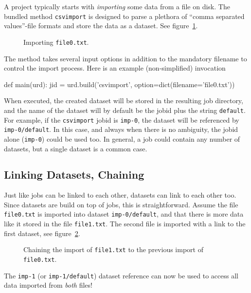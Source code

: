 A project typically starts with \textsl{importing} some data from a
file on disk.  The bundled method \texttt{csvimport} is designed to
parse a plethora of ``comma separated values''-file formats and store
the data as a dataset.  See figure~\ref{fig:dataset_csvimport}.
\begin{figure}[h!]
  \begin{center}
    
    \caption{Importing \texttt{file0.txt}.}
    \label{fig:dataset_csvimport}
  \end{center}
\end{figure}
The method takes several input options in addition to the mandatory
filename to control the import process.  Here is an example
(non-simplified) invocation
\begin{python}
def main(urd):
    jid = urd.build('csvimport', option=dict(filename='file0.txt'))  
\end{python}
When executed, the created dataset will be stored in the resulting job
directory, and the name of the dataset will by default be the jobid
plus the string \texttt{default}.  For example, if the
\texttt{csvimport} jobid is \texttt{imp-0}, the dataset will be
referenced by \texttt{imp-0/default}.  In this case, and always when
there is no ambiguity, the jobid alone (\texttt{imp-0}) could be used
too.  In general, a job could contain any number of datasets, but a
single dataset is a common case.




\subsection{Linking Datasets, Chaining}

Just like jobs can be linked to each other, datasets can link to each
other too.  Since datasets are build on top of jobs, this is
straightforward.  Assume the file \texttt{file0.txt} is imported into
dataset \texttt{imp-0/default}, and that there is more data like it
stored in the file \texttt{file1.txt}.  The second file is imported
with a link to the first dataset, see
figure~\ref{fig:dataset_csvimport_chain}.
\begin{figure}[h!]
  \begin{center}
    
    \caption{Chaining the import of \texttt{file1.txt} to the previous
      import of \texttt{file0.txt}.}
    \label{fig:dataset_csvimport_chain}
  \end{center}
\end{figure}
The \texttt{imp-1} (or \texttt{imp-1/default}) dataset reference can
now be used to access all data imported from \textsl{both} files!

